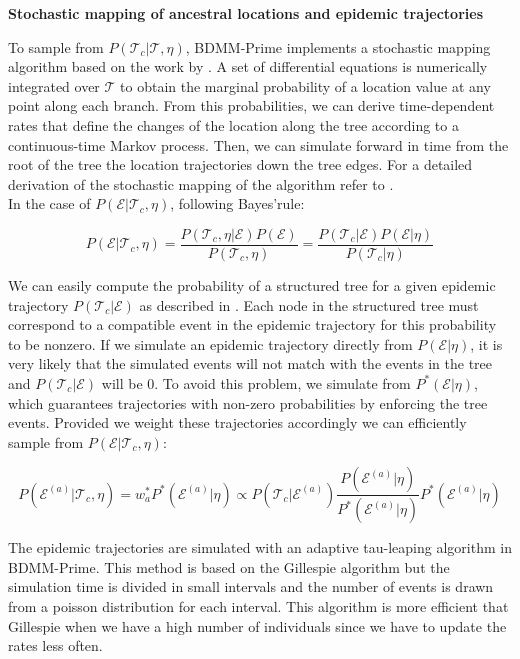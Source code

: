 \textbf{Stochastic mapping of ancestral locations and epidemic trajectories}

To sample from $P(\mathcal{T}_c|\mathcal{T}, \eta)$, BDMM-Prime implements a stochastic mapping algorithm based on the work by \cite{Hohna2019}. A set of differential equations is numerically integrated over $\mathcal{T}$ to obtain the marginal probability of a location value at any point along each branch. From this probabilities, we can derive time-dependent rates that define the changes of the location along the tree according to a continuous-time Markov process. Then, we can simulate forward in time from the root of the tree the location trajectories down the tree edges. For a detailed derivation of the stochastic mapping of the algorithm refer to \cite{VaughanWIP}.\\

In the case of $P(\mathcal{E}|\mathcal{T}_c, \eta)$, following Bayes'rule:

\begin{equation}
P(\mathcal{E}|\mathcal{T}_c, \eta) = \frac{P(\mathcal{T}_c, \eta|\mathcal{E}) P(\mathcal{E})}{P(\mathcal{T}_c, \eta)} = \frac{P(\mathcal{T}_c|\mathcal{E}) P(\mathcal{E}| \eta)}{P(\mathcal{T}_c | \eta)}
\label{trajectories}
\end{equation}

We can easily compute the probability of a structured tree for a given epidemic trajectory $P(\mathcal{T}_c|\mathcal{E})$ as described in \cite{Vaughan2019}. Each node in the structured tree must correspond to a compatible event in the epidemic trajectory for this probability to be nonzero. If we simulate an epidemic trajectory directly from $P(\mathcal{E}| \eta)$, it is very likely that the simulated events will not match with the events in the tree and $P(\mathcal{T}_c|\mathcal{E})$ will be 0. To avoid this problem, we simulate from $P^*(\mathcal{E}| \eta)$, which guarantees trajectories with non-zero probabilities by enforcing the tree events. Provided we weight these trajectories accordingly we can efficiently sample from $P(\mathcal{E}|\mathcal{T}_c, \eta)$:

\begin{equation}
P(\mathcal{E}^{(a)}|\mathcal{T}_c, \eta) = w_a^* P^*(\mathcal{E}^{(a)}| \eta) \propto P(\mathcal{T}_c | \mathcal{E}^{(a)}) \frac{P(\mathcal{E}^{(a)} | \eta)}{P^*(\mathcal{E}^{(a)} | \eta)} P^*(\mathcal{E}^{(a)}| \eta)
\label{eq:traj}
\end{equation}

The epidemic trajectories are simulated with an adaptive tau-leaping algorithm \cite{Gillespie2000} in BDMM-Prime. This method is based on the Gillespie algorithm \cite{Gillespie1977} but the simulation time is divided in small intervals and the number of events is drawn from a poisson distribution for each interval. This algorithm is more efficient that Gillespie when we have a high number of individuals since we have to update the rates less often. 

